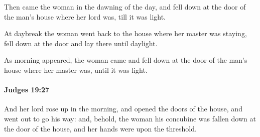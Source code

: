 			\begin{versebox}
					\item[BHS] 
					\item[ASV] Then came the woman in the dawning of the day, and fell down at the door of the man's house where her lord was, till it was light.
					\item[NIV] At daybreak the woman went back to the house where her master was staying, fell down at the door and lay there until daylight.
					\item[NRSV] As morning appeared, the woman came and fell down at the door of the man’s house where her master was, until it was light.
			\end{versebox}

		\paragraph{Judges 19:27} %
			\label{JUDGES-19-27}

			And her lord rose up in the morning, and opened the doors of the house, and went out to go his way: and, behold, the woman his concubine was fallen down at the door of the house, and her hands were upon the threshold.

